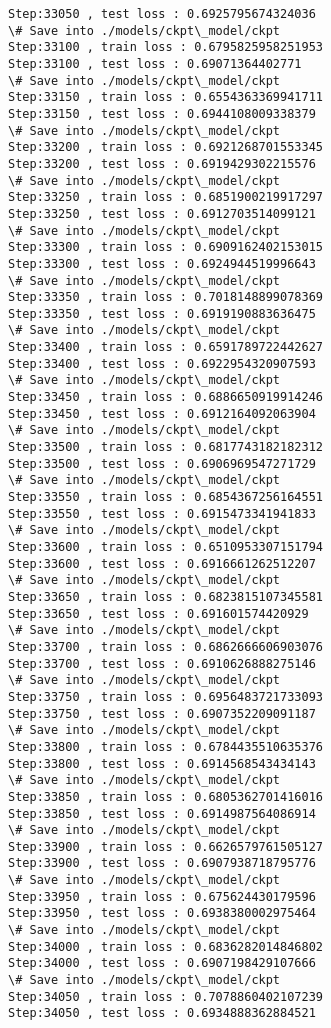 \documentclass[11pt]{article}
\begin{document}
\begin{Verbatim}[commandchars=\\\{\}]
Step:33050 , test loss : 0.6925795674324036
\# Save into ./models/ckpt\_model/ckpt
Step:33100 , train loss : 0.6795825958251953
Step:33100 , test loss : 0.69071364402771
\# Save into ./models/ckpt\_model/ckpt
Step:33150 , train loss : 0.6554363369941711
Step:33150 , test loss : 0.6944108009338379
\# Save into ./models/ckpt\_model/ckpt
Step:33200 , train loss : 0.6921268701553345
Step:33200 , test loss : 0.6919429302215576
\# Save into ./models/ckpt\_model/ckpt
Step:33250 , train loss : 0.6851900219917297
Step:33250 , test loss : 0.6912703514099121
\# Save into ./models/ckpt\_model/ckpt
Step:33300 , train loss : 0.6909162402153015
Step:33300 , test loss : 0.6924944519996643
\# Save into ./models/ckpt\_model/ckpt
Step:33350 , train loss : 0.7018148899078369
Step:33350 , test loss : 0.6919190883636475
\# Save into ./models/ckpt\_model/ckpt
Step:33400 , train loss : 0.6591789722442627
Step:33400 , test loss : 0.6922954320907593
\# Save into ./models/ckpt\_model/ckpt
Step:33450 , train loss : 0.6886650919914246
Step:33450 , test loss : 0.6912164092063904
\# Save into ./models/ckpt\_model/ckpt
Step:33500 , train loss : 0.6817743182182312
Step:33500 , test loss : 0.6906969547271729
\# Save into ./models/ckpt\_model/ckpt
Step:33550 , train loss : 0.6854367256164551
Step:33550 , test loss : 0.6915473341941833
\# Save into ./models/ckpt\_model/ckpt
Step:33600 , train loss : 0.6510953307151794
Step:33600 , test loss : 0.6916661262512207
\# Save into ./models/ckpt\_model/ckpt
Step:33650 , train loss : 0.6823815107345581
Step:33650 , test loss : 0.691601574420929
\# Save into ./models/ckpt\_model/ckpt
Step:33700 , train loss : 0.6862666606903076
Step:33700 , test loss : 0.6910626888275146
\# Save into ./models/ckpt\_model/ckpt
Step:33750 , train loss : 0.6956483721733093
Step:33750 , test loss : 0.6907352209091187
\# Save into ./models/ckpt\_model/ckpt
Step:33800 , train loss : 0.6784435510635376
Step:33800 , test loss : 0.6914568543434143
\# Save into ./models/ckpt\_model/ckpt
Step:33850 , train loss : 0.6805362701416016
Step:33850 , test loss : 0.6914987564086914
\# Save into ./models/ckpt\_model/ckpt
Step:33900 , train loss : 0.6626579761505127
Step:33900 , test loss : 0.6907938718795776
\# Save into ./models/ckpt\_model/ckpt
Step:33950 , train loss : 0.675624430179596
Step:33950 , test loss : 0.6938380002975464
\# Save into ./models/ckpt\_model/ckpt
Step:34000 , train loss : 0.6836282014846802
Step:34000 , test loss : 0.6907198429107666
\# Save into ./models/ckpt\_model/ckpt
Step:34050 , train loss : 0.7078860402107239
Step:34050 , test loss : 0.6934888362884521

\end{Verbatim}
\end{document}
